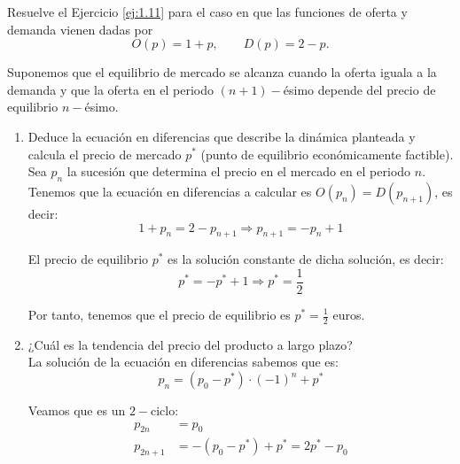 \begin{ejercicio} \label{ej:1.13}
    Resuelve el Ejercicio \ref{ej:1.11} para el caso en que las funciones de oferta y demanda vienen dadas por
    \begin{equation*}
        O(p)=1+p,\qquad D(p)=2-p.
    \end{equation*}

    Suponemos que el equilibrio de mercado se alcanza cuando la oferta iguala a la demanda y que la oferta en el periodo $(n + 1)-$ésimo depende del precio de equilibrio $n-$ésimo.
    \begin{enumerate}
        \item Deduce la ecuación en diferencias que describe la dinámica planteada y calcula el precio de mercado $p^\ast$ (punto de equilibrio económicamente factible).\\

        Sea $p_n$ la sucesión que determina el precio en el mercado en el periodo $n$. Tenemos que la ecuación en diferencias a calcular es $O(p_{n})=D(p_{n+1})$, es decir:
        \begin{equation*}
            1+p_n = 2-p_{n+1} \Longrightarrow p_{n+1} = -p_n +1
        \end{equation*}

        El precio de equilibrio $p^\ast$ es la solución constante de dicha solución, es decir:
        \begin{equation*}
            p^\ast = -p^\ast +1 \Longrightarrow p^\ast = \frac{1}{2}
        \end{equation*}

        Por tanto, tenemos que el precio de equilibrio es $p^\ast = \frac{1}{2}$ euros.
        
        \item ¿Cuál es la tendencia del precio del producto a largo plazo?\\

        La solución de la ecuación en diferencias sabemos que es:
        \begin{equation*}
            p_{n} = (p_0-p^\ast)\cdot \left(-1\right)^n + p^\ast
        \end{equation*}

        Veamos que es un $2-$ciclo:
        \begin{align*}
            p_{2n} &= p_0\\
            p_{2n+1} &= -(p_0-p^\ast)+p^\ast = 2p^\ast - p_0            
        \end{align*}


\end{enumerate}
\end{ejercicio}
